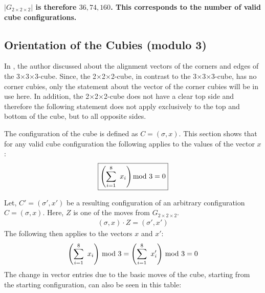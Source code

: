 \documentclass[12pt,a4paper]{article}
\theoremstyle{custom}
\newcommand{\Gtwo}{\ensuremath{G_{2\times 2\times 2}}}
\newcommand{\Ttwo}{2$\times$2$\times$2-}
\newcommand{\Tthree}{3$\times$3$\times$3-}
\begin{document}
\textbf{$|\Gtwo|$ is therefore $36,74, 160$.
This corresponds to the number of valid cube configurations.}


\subsection{Orientation of the Cubies (modulo 3)}

\label{Section_Modulo3}

In \cite{JC}, the author discussed about the alignment vectors of the corners and edges of the \Tthree cube. Since, the \Ttwo cube, in contrast to the \Tthree cube, has no corner cubies, only the statement about the vector of the corner cubies will be in use here. In addition, the \Ttwo cube does not have a clear top side and therefore the following statement does not apply exclusively to the top and bottom of the cube, but to all opposite sides.


The configuration of the cube is defined as $C=(\sigma, x)$. This section shows that for any valid cube configuration the following applies to the values of the vector $x$:
\begin{displaymath}
\boxed{\left( \sum_{i= 1}^{8} \ x_i \right) \hspace*{-0.7em} \mod 3 = 0}
\end{displaymath}

Let, $C'=(\sigma', x')$ be a resulting configuration of an arbitrary configuration $C=(\sigma, x)$. Here, $Z$ is one of the moves from $\Gtwo$.
\begin{align*}
{(\sigma, x) \cdot Z = (\sigma', x')}
\end{align*}
The following then applies to the vectors $x$ and $x'$:
\begin{align*}
\left( \sum_{i= 1}^{8} \ x_i \right) \hspace*{-0.5em} \mod 3 = \left( \sum_{i= 1}^{8} \ x_i' \right ) \hspace*{-0.5em} \mod 3 = 0
\end{align*}
The change in vector entries due to the basic moves of the cube, starting from the starting configuration, can also be seen in this table:
\vspace*{1em}
\end{document}
